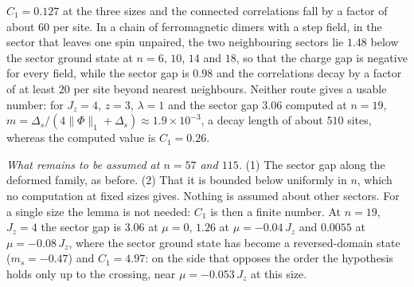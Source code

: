 \documentclass[aps,prx,onecolumn,10pt,nofootinbib,longbibliography,floatfix]{revtex4-2}
\theoremstyle{remark}
\newcommand{\Jz}{J_z}
\newcommand{\ms}{m_s}
\begin{document}
$C_1=0.127$ at the three sizes and the connected correlations fall by a factor of about $60$ per site. %
In a chain of ferromagnetic dimers with a step field, in the sector that leaves one spin unpaired, the two
neighbouring sectors lie $1.48$ below the sector ground state at $n=6$, $10$, $14$ and $18$, so that the charge gap %
is negative for every field, while the sector gap is $0.98$ and the correlations decay by a factor of at least $20$ %
per site beyond nearest neighbours.
Neither route gives a usable number: for $\Jz=4$, $z=3$, $\lambda=1$ and the sector gap $3.06$ %
computed at $n=19$, $m=\Delta_s/(4\|\Phi\|_1+\Delta_s)\approx1.9\times10^{-3}$, a decay length of about $510$ sites, %
whereas the computed value is $C_1=0.26$. %

\emph{What remains to be assumed at $n=57$ and $115$.} (1) The sector gap along the deformed family, as before. %
(2) That it is bounded below uniformly in $n$, which no computation at fixed sizes gives. Nothing is assumed about %
other sectors. For a single size the lemma is not needed: $C_1$ is then a finite number. At $n=19$, $\Jz=4$ the
sector gap is $3.06$ at $\mu=0$, $1.26$ at $\mu=-0.04\,\Jz$ and $0.0055$ at $\mu=-0.08\,\Jz$, where the sector %
ground state has become a reversed-domain state ($\ms=-0.47$) and $C_1=4.97$: on the side that opposes the order %
the hypothesis holds only up to the crossing, near $\mu=-0.053\,\Jz$ at this size. %
\end{document}
